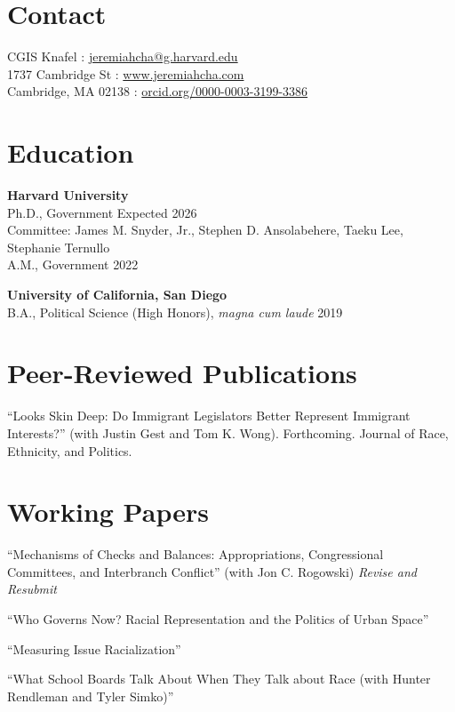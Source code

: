 \documentclass[margin, line]{res}
\begin{document}
\begin{resume}

\section{Contact}
CGIS Knafel \hfill \Letter: \href{mailto:jeremiahcha@g.harvard.edu}{jeremiahcha@g.harvard.edu}\\
1737 Cambridge St \hfill \Mundus: \href{httsp://www.jeremiahcha.com}{www.jeremiahcha.com}\\
Cambridge, MA 02138 \hfill \Mundus: \href{https://orcid.org/0000-0003-3199-3386}{orcid.org/0000-0003-3199-3386}

\section{Education}
\textbf{Harvard University}\\
\hspace*{5mm} Ph.D., Government \hfill Expected 2026\\
\hspace*{10mm} {\footnotesize Committee: James M. Snyder, Jr., Stephen D. Ansolabehere, Taeku Lee, Stephanie Ternullo}\\
\hspace*{5mm} A.M., Government \hfill 2022

\textbf{University of California, San Diego}\\
\hspace*{5mm} B.A., Political Science (High Honors), \textit{magna cum laude} \hfill 2019

\section{Peer-Reviewed Publications}
\begin{etaremune}
	\item ``Looks Skin Deep: Do Immigrant Legislators Better Represent Immigrant Interests?'' (with Justin Gest and Tom K. Wong). Forthcoming. Journal of Race, Ethnicity, and Politics. 
\end{etaremune}



\section{Working Papers}
\begin{etaremune}
	\item ``Mechanisms of Checks and Balances: Appropriations, Congressional Committees, and Interbranch Conflict'' (with Jon C. Rogowski) \hfill \textit{Revise and Resubmit}
	\item ``Who Governs Now? Racial Representation and the Politics of Urban Space''
	\item ``Measuring Issue Racialization''
	\item ``What School Boards Talk About When They Talk about Race (with Hunter Rendleman and Tyler Simko)'' 
\end{etaremune}


\end{resume}
\end{document}
